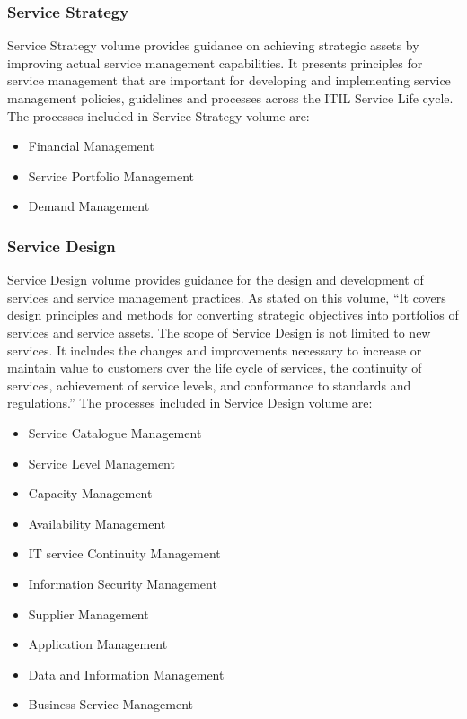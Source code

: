 \subsubsection{Service Strategy} 

Service Strategy volume provides guidance on achieving strategic assets by improving actual service management capabilities. It presents principles for service management that are important for developing and implementing service management policies, guidelines and processes across the ITIL Service Life cycle.\cite{itilSS} The processes included in Service Strategy volume are:

\begin{itemize}
  \item Financial Management
  \item Service Portfolio Management 
  \item Demand Management
\end{itemize}

\subsubsection{Service Design}

Service Design volume provides guidance for the design and development of services and service management practices. As stated on this volume, ``It covers design principles and methods for converting strategic objectives into portfolios of services and service assets. The scope of Service Design is not limited to new services. It includes the changes and improvements necessary to increase or maintain value to customers over the life cycle of services, the continuity of services, achievement of service levels, and conformance to standards and regulations.''\cite{itilSD} The processes included in Service Design volume are:

\begin{itemize}
  \item Service Catalogue Management
  \item Service Level Management 
  \item Capacity Management
  \item Availability Management
  \item IT service Continuity Management
  \item Information Security Management 
  \item Supplier Management
  \item Application Management
  \item Data and Information Management
  \item Business Service Management
\end{itemize} 

